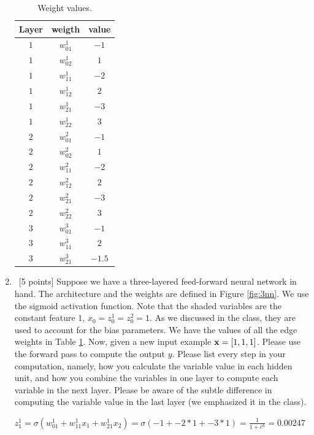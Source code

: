 \documentclass[12pt, fullpage,letterpaper]{article}
\begin{document}
\begin{enumerate}
	\begin{table}[h]
		\centering
		\begin{tabular}{c|cc}
			Layer & weigth  & value\\ 
			\hline\hline
			$1$ & $w_{01}^1$ & $-1$ \\ \hline
			$1$ & $w_{02}^1$ & $1$ \\ \hline
			$1$ & $w_{11}^1$ & $-2$ \\ \hline
			$1$ & $w_{12}^1$ & $2$ \\ \hline
			$1$ & $w_{21}^1$ & $-3$ \\ \hline
			$1$ & $w_{22}^1$ & $3$ \\ \hline
			$2$ & $w_{01}^2$ & $-1$ \\ \hline
			$2$ & $w_{02}^2$ & $1$ \\ \hline
			$2$ & $w_{11}^2$ & $-2$ \\ \hline
			$2$ & $w_{12}^2$ & $2$ \\ \hline
			$2$ & $w_{21}^2$ & $-3$ \\ \hline
			$2$ & $w_{22}^2$ & $3$ \\ \hline
			$3$ & $w_{01}^3$ & $-1$ \\ \hline
			$3$ & $w_{11}^3$ & $2$ \\ \hline
			$3$ & $w_{21}^3$ & $-1.5$ \\ \hline
		\end{tabular}
		\caption{Weight values.}
		\label{tb:w}
	\end{table}
	
	\item~[5 points] Suppose we have a three-layered feed-forward neural network in hand. The architecture and the weights are defined in Figure \ref{fig:3nn}. We use the sigmoid activation function. Note that the shaded variables are the constant feature $1$, \ie $x_0 = z_{0}^1 = z_{0}^2 = 1$. As we discussed in the class, they are used to account for the bias parameters. 
	We have the values of all the edge weights in Table \ref{tb:w}. Now, given a new input example ${\bf x}=[1, 1, 1]$. Please use the forward pass to compute the output $y$. Please list every step in your computation, namely, how you calculate the variable value in each hidden unit, and how  you combine the variables in one layer to compute each variable in the next layer. Please be aware of the subtle difference in computing the variable value in the last layer (we emphasized it in the class). 
	
	
	$z^1_1 = \sigma(w^1_{01} + w^1_{11}x_1 + w^1_{21}x_2) = \sigma(-1 + -2*1 + -3*1) = \frac{1}{1+e^6} = 0.00247$
	

\end{enumerate}
\end{document}
